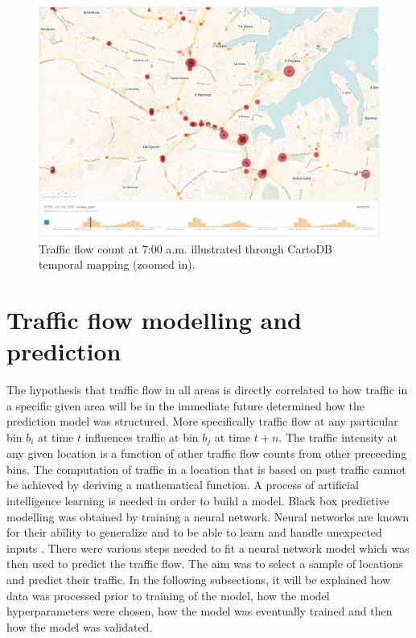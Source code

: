 \documentclass[12pt, a4paper]{report}
\theoremstyle{definition}
\theoremstyle{definition}%
\theoremstyle{definition}%
\theoremstyle{definition}%
\theoremstyle{definition}%
\theoremstyle{definition}%
\begin{document}
\begin{figure}[!]	
	\includegraphics[scale=0.4]{traffic_torque_700am_zoomin.jpg}
	\centering
	\caption{Traffic flow count at 7:00 a.m. illustrated through CartoDB temporal mapping (zoomed in). }
	\label{fig:traffic_torque_700am_zoomin}
\end{figure}

 



\section{Traffic flow modelling and prediction} \label{section:traffic_flow_modelling_and_prediction}


The hypothesis that traffic flow in all areas is directly correlated to how traffic in a specific given area will be in the immediate future determined how the prediction model was structured. More specifically traffic flow at any particular bin $b_i$ at time $t$ influences traffic at bin $b_j$ at time $t + n$. The traffic intensity at any given location is a function of other traffic flow counts from other preceeding bins. The computation of traffic in a location that is based on past traffic cannot be achieved by deriving a mathematical function. A process of artificial intelligence learning is needed in order to build a model. Black box predictive modelling was obtained by training a neural network. Neural networks are known for their ability to generalize and to be able to learn and handle unexpected inputs \cite{sommer2013using}. There were various steps needed to fit a neural network model which was then used to predict the traffic flow. The aim was to select a sample of locations and predict their traffic. In the following subsections, it will be explained how data was processed prior to training of the model, how the model hyperparameters were chosen, how the model was eventually trained and then how the model was validated.
\end{document}
